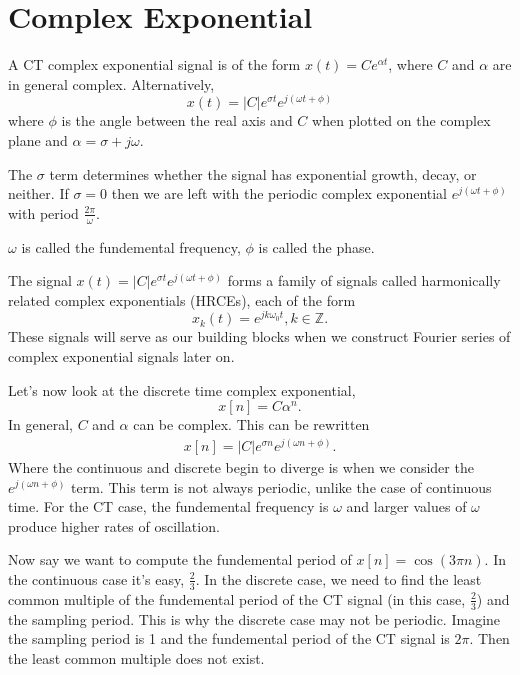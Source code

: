 \section{Complex Exponential}
A CT complex exponential signal is of the form 
$x(t) = Ce^{\alpha t}$, where $C$ and $\alpha$ 
are in general complex. Alternatively, 
\begin{equation}
    x(t) = |C| e^{\sigma t} e^{j(\omega t + \phi)}
\end{equation}
where $\phi$ is the angle between the real axis and 
$C$ when plotted on the complex plane and $\alpha = \sigma + j\omega$. 

The $\sigma$ term determines whether the signal has exponential 
growth, decay, or neither. If $\sigma = 0$ then we are left 
with the periodic complex exponential $e^{j(\omega t + \phi)}$ 
with period $\frac{2\pi}{\omega}$. 

$\omega$ is called the fundemental frequency, 
$\phi$ is called the phase. 

The signal $x(t) = |C|e^{\sigma t}e^{j(\omega t + \phi)}$
forms a family of signals called harmonically 
related complex exponentials (HRCEs), each of the 
form 
\begin{equation}
    x_k(t) = e^{jk\omega_0 t}, k \in \mathbb{Z}.
\end{equation}
These signals will serve as our building 
blocks when we construct Fourier series 
of complex exponential signals later on. 

Let's now look at the discrete time 
complex exponential,
\begin{equation}
    x[n] = C \alpha^n.
\end{equation}
In general, $C$ and $\alpha$ can be complex. 
This can be rewritten 
\begin{eqnarray}
    x[n] = |C|e^{\sigma n} e^{j(\omega n + \phi)}. 
\end{eqnarray}
Where the continuous and discrete begin 
to diverge is when we consider the 
$e^{j(\omega n + \phi)}$ term. This 
term is not always periodic, unlike 
the case of continuous time. For 
the CT case, the fundemental 
frequency is $\omega$ and larger 
values of $\omega$ produce 
higher rates of oscillation. 

Now say we want to compute the 
fundemental period of $x[n] = \cos(3\pi n)$. 
In the continuous case it's easy, $\frac{2}{3}$.
In the discrete case, we need to 
find the least common multiple 
of the fundemental period 
of the CT signal (in this case, 
$\frac{2}{3}$) and the sampling 
period. This is why the 
discrete case may not be periodic.
Imagine the sampling period is 1
and the fundemental period of the 
CT signal is $2 \pi$. Then the 
least common multiple does not 
exist. 

